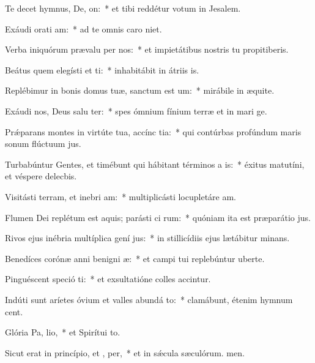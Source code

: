\item Te decet hymnus, De,  on:~* et tibi reddétur votum in Jesalem.
\item Exáudi orati am:~* ad te omnis caro niet.
\item Verba iniquórum prævalu per nos:~* et impietátibus nostris tu propitiberis.
\item Beátus quem elegísti et ti:~* inhabitábit in átriis is.
\item Replébimur in bonis domus tuæ, sanctum est  um:~* mirábile in æquite.
\item Exáudi nos, Deus salu ter:~* spes ómnium fínium terræ et in mari ge.
\item Prǽparans montes in virtúte tua, accínc tia:~* qui contúrbas profúndum maris sonum flúctuum jus.
\item Turbabúntur Gentes, et timébunt qui hábitant términos a  is:~* éxitus matutíni, et véspere delecbis.
\item Visitásti terram, et inebri am:~* multiplicásti locupletáre am.
\item Flumen Dei replétum est aquis; parásti ci rum:~* quóniam ita est præparátio jus.
\item Rivos ejus inébria multíplica gení jus:~* in stillicídiis ejus lætábitur minans.
\item Benedíces corónæ anni benigni æ:~* et campi tui replebúntur uberte.
\item Pinguéscent speció ti:~* et exsultatióne colles accintur.
\item Indúti sunt aríetes óvium et valles abundá to:~* clamábunt, étenim hymnum cent.
\item Glória Pa,  lio,~* et Spirítui to.
\item Sicut erat in princípio, et ,  per,~* et in sǽcula sæculórum. men.
